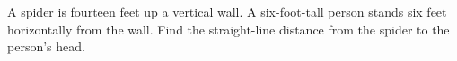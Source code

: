 A spider is fourteen feet up a vertical wall. A six-foot-tall person stands six feet horizontally from the wall. Find the straight-line distance from the spider to the person's head.
